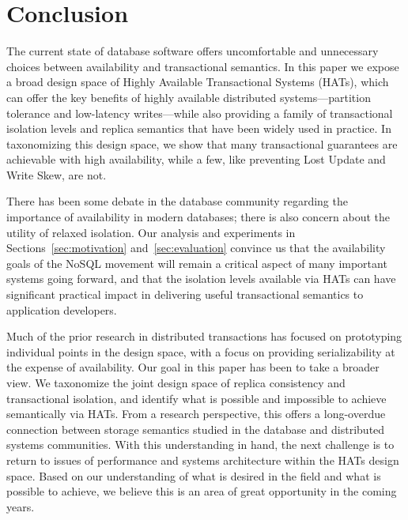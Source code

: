 
\section{Conclusion}
The current state of database software offers uncomfortable and unnecessary
choices between availability and transactional semantics.
In this paper we expose a broad design space of Highly Available Transactional 
Systems (HATs), which can offer the key benefits of
highly available distributed systems---partition tolerance and low-latency 
writes---while also providing a family of transactional isolation 
levels and replica semantics that have been widely used in practice. 
In taxonomizing this design space, we show that many transactional 
guarantees are achievable with high availability, while a few, 
like preventing Lost Update and Write Skew, are not. 

There has been some debate in the database community regarding the importance
of availability in modern databases; there is also concern about the utility of
relaxed isolation.  Our analysis and experiments in Sections~\ref{sec:motivation} 
and~\ref{sec:evaluation} convince us that the availability goals of the NoSQL
movement will remain a critical aspect of many important systems going forward, and 
that the isolation levels available via HATs can have significant practical impact
in delivering useful transactional semantics to application developers.

Much of the prior research in distributed transactions has focused on prototyping 
individual points in the design space, with a focus on providing serializability
at the expense of availability.  Our goal in this paper has been to take a broader view. 
We taxonomize the joint design space of replica consistency and transactional isolation,
and identify what is possible and impossible to achieve semantically via HATs.  From
a research perspective, this offers a long-overdue connection between storage 
semantics studied in the database and distributed systems communities.
With this understanding in hand, the next challenge is to return to issues of 
performance and systems architecture within the HATs design space.  Based on our 
understanding of what is desired in the field and what is possible to achieve, we 
believe this is an area of great opportunity in the coming years.